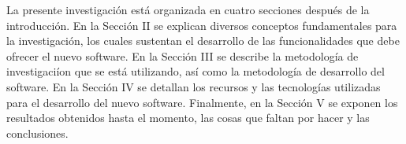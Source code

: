 \documentclass[conference]{IEEEtran}
\begin{document}
La presente investigaci\'{o}n est\'{a} organizada en cuatro secciones despu\'{e}s de la introducci\'{o}n. En la Secci\'{o}n II se explican diversos conceptos fundamentales para la investigaci\'{o}n, los cuales sustentan el desarrollo de las funcionalidades que debe ofrecer el nuevo software. En la Secci\'{o}n III se describe la metodolog\'{i}a de investigaci\'{i}on que se est\'{a} utilizando, as\'{i} como la metodolog\'{i}a de desarrollo del software. En la Secci\'{o}n IV se detallan los recursos y las tecnolog\'{i}as utilizadas para el desarrollo del nuevo software. Finalmente, en la Secci\'{o}n V se exponen los resultados obtenidos hasta el momento, las cosas que faltan por hacer y las conclusiones.


%
%



%
%
\end{document}
